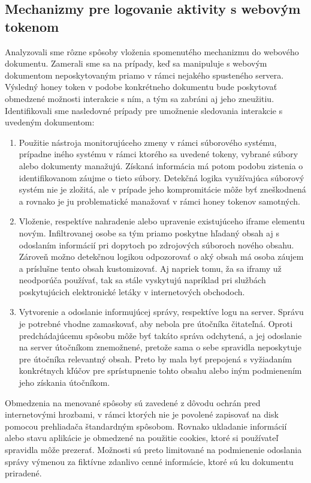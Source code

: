 \documentclass[conference, 11pt,slovak,a4paper,twoside]{IEEEtran}
\begin{document}
\subsection{Mechanizmy pre logovanie aktivity s webovým tokenom} \label{mechanismForLoggingActivity}

Analyzovali sme rôzne spôsoby vloženia spomenutého mechanizmu do webového dokumentu. Zamerali sme sa na prípady, keď sa manipuluje s webovým dokumentom neposkytovaným priamo v rámci nejakého spusteného servera. Výsledný honey token v podobe konkrétneho dokumentu bude poskytovať obmedzené možnosti interakcie s ním, a tým sa zabráni aj jeho zneužitiu. Identifikovali sme nasledovné prípady pre umožnenie sledovania interakcie s uvedeným dokumentom:

\begin{enumerate}
	\item Použitie nástroja monitorujúceho zmeny v rámci súborového systému, prípadne iného systému v rámci ktorého sa uvedené tokeny, vybrané súbory alebo dokumenty manažujú. Získaná informácia má potom podobu zistenia o identifikovanom záujme o tieto súbory. Detekčná logika využívajúca súborový systém nie je zložitá, ale v prípade jeho kompromitácie môže byť zneškodnená a rovnako je ju problematické manažovať v rámci honey tokenov samotných.
	
	\item Vloženie, respektíve nahradenie alebo upravenie existujúceho iframe elementu novým. Infiltrovanej osobe sa tým priamo poskytne hľadaný obsah aj s odoslaním informácií pri dopytoch po zdrojových súboroch nového obsahu. Zároveň možno detekčnou logikou odpozorovať o aký obsah má osoba záujem a príslušne tento obsah kustomizovať. Aj napriek tomu, ža sa iframy už neodporúča používať, tak sa stále vyskytujú napríklad pri službách poskytujúcich elektronické letáky v internetových obchodoch.

	\item Vytvorenie a odoslanie informujúcej správy, respektíve logu na server. Správu je potrebné vhodne zamaskovať, aby nebola pre útočníka čitateľná. Oproti predchádajúcemu spôsobu môže byť takáto správa odchytená, a jej odoslanie na server útočníkom znemožnené, pretože sama o sebe spravidla neposkytuje pre útočníka relevantný obsah. Preto by mala byť prepojená s vyžiadaním konkrétnych kľúčov pre sprístupnenie tohto obsahu alebo iným podmienením jeho získania útočníkom. 
\end{enumerate}
 
Obmedzenia na menované spôsoby sú zavedené z dôvodu ochrán pred internetovými hrozbami, v rámci ktorých nie je povolené zapisovať na disk pomocou prehliadača štandardným spôsobom. Rovnako ukladanie informácií alebo stavu aplikácie je obmedzené na použitie cookies, ktoré si používateľ spravidla môže prezerať. Možnosti sú preto limitované na podmienenie odoslania správy výmenou za fiktívne zdanlivo cenné informácie, ktoré sú ku dokumentu priradené.
  
\end{document}
